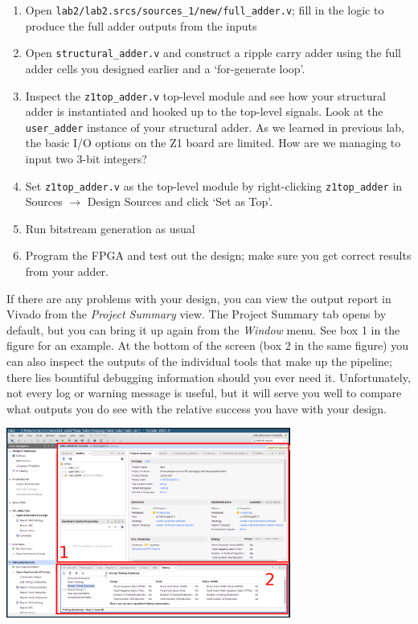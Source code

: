 \documentclass[11pt]{article}
\begin{document}
\begin{enumerate}
  \item Open \verb|lab2/lab2.srcs/sources_1/new/full_adder.v|; fill in the logic to produce the full adder outputs from the inputs
  \item Open \verb|structural_adder.v| and construct a ripple carry adder using the full adder cells you designed earlier and a `for-generate loop'.
  \item Inspect the \verb|z1top_adder.v| top-level module and see how your structural adder is instantiated and hooked up to the top-level signals.
    Look at the \verb|user_adder| instance of your structural adder.
    As we learned in previous lab, the basic I/O options on the Z1 board are limited. How are we managing to input two 3-bit integers?
  \item Set \texttt{z1top\_adder.v} as the top-level module by right-clicking \texttt{z1top\_adder} in Sources $\rightarrow$ Design Sources and click `Set as Top'.
  \item Run bitstream generation as usual
  \item Program the FPGA and test out the design; make sure you get correct results from your adder.
\end{enumerate}


If there are any problems with your design, you can view the output report in Vivado from the \emph{Project Summary} view. The Project Summary tab opens by default, but you can bring it up again from the \emph{Window} menu. See box 1 in the figure for an example. At the bottom of the screen (box 2 in the same figure) you can also inspect the outputs of the individual tools that make up the pipeline; there lies bountiful debugging information should you ever need it. Unfortunately, not every log or warning message is useful, but it will serve you well to compare what outputs you do see with the relative success you have with your design.

\begin{center}
  \includegraphics[width=0.7\textwidth]{figs/vivado_project_summary.png}
\end{center}
\end{document}
